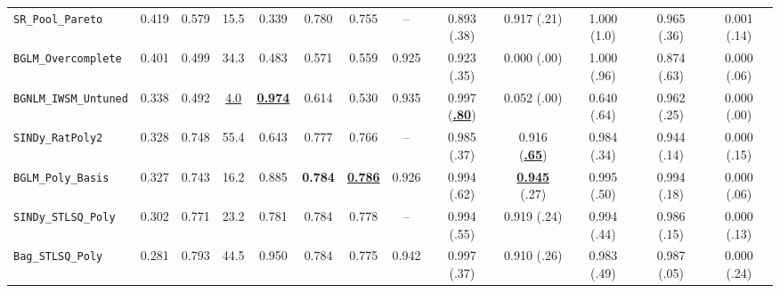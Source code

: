 \documentclass{article}
\begin{document}
\begin{table}[t]
{\begin{tabular}{lcccccccccccc}
\texttt{SR\_Pool\_Pareto} & 0.419 & 0.579 & 15.5 & 0.339 & 0.780 & 0.755 & -- & 0.893 (.38) & 0.917 (.21) & 1.000 (1.0) & 0.965 (.36) & 0.001 (.14) \\
\texttt{BGLM\_Overcomplete} & 0.401 & 0.499 & 34.3 & 0.483 & 0.571 & 0.559 & 0.925 & 0.923 (.35) & 0.000 (.00) & 1.000 (.96) & 0.874 (.63) & 0.000 (.06) \\
\texttt{BGNLM\_IWSM\_Untuned} & 0.338 & 0.492 & \underline{4.0} & \underline{\textbf{0.974}} & 0.614 & 0.530 & 0.935 & 0.997 (\underline{\textbf{.80}}) & 0.052 (.00) & 0.640 (.64) & 0.962 (.25) & 0.000 (.00) \\
\texttt{SINDy\_RatPoly2} & 0.328 & 0.748 & 55.4 & 0.643 & 0.777 & 0.766 & -- & 0.985 (.37) & 0.916 (\underline{\textbf{.65}}) & 0.984 (.34) & 0.944 (.14) & 0.000 (.15) \\
\texttt{BGLM\_Poly\_Basis} & 0.327 & 0.743 & 16.2 & 0.885 & \textbf{0.784} & \underline{\textbf{0.786}} & 0.926 & 0.994 (.62) & \underline{\textbf{0.945}} (.27) & 0.995 (.50) & 0.994 (.18) & 0.000 (.06) \\
\texttt{SINDy\_STLSQ\_Poly} & 0.302 & 0.771 & 23.2 & 0.781 & 0.784 & 0.778 & -- & 0.994 (.55) & 0.919 (.24) & 0.994 (.44) & 0.986 (.15) & 0.000 (.13) \\
\texttt{Bag\_STLSQ\_Poly} & 0.281 & 0.793 & 44.5 & 0.950 & 0.784 & 0.775 & 0.942 & 0.997 (.37) & 0.910 (.26) & 0.983 (.49) & 0.987 (.05) & 0.000 (.24) \\
\bottomrule
\end{tabular}%
}
\end{table}
\end{document}
